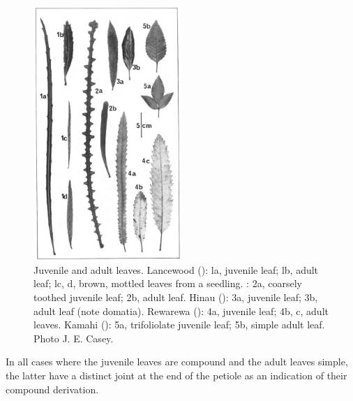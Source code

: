 \begin{figure}
	\includegraphics[width=0.5\textwidth]{graphics/figure19leaves.jpg}
	\centering
	\caption[Juvenile and adult leaves]{Juvenile and adult leaves.
Lancewood (): la, juvenile leaf; lb, adult leaf; lc, d, brown, mottled leaves from a seedling. : 2a, coarsely toothed juvenile leaf; 2b, adult leaf.
Hinau (): 3a, juvenile leaf; 3b, adult leaf (note domatia).
Rewarewa (): 4a, juvenile leaf; 4b, c, adult leaves.
Kamahi (): 5a, trifoliolate juvenile leaf; 5b, simple adult leaf.
Photo  J. E. Casey.}
	\label{fig:19leaves}
\end{figure}

In all cases where the juvenile leaves are compound and the adult leaves simple, the latter have a distinct joint at the end of the petiole as an indication of their compound derivation.

